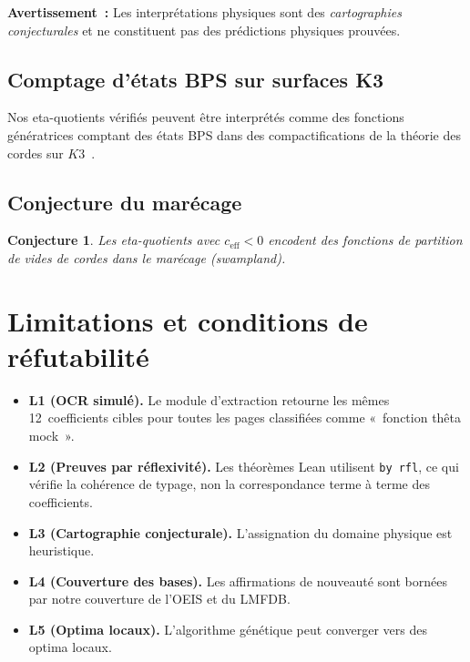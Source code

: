 \documentclass[11pt,a4paper]{article}
\theoremstyle{plain}
\newtheorem{conjecture}[theorem]{Conjecture}
\theoremstyle{definition}
\newcommand{\ceff}{c_{\mathrm{eff}}}
\begin{document}
\textbf{Avertissement~:} Les interprétations physiques
sont des \emph{cartographies conjecturales} et ne
constituent pas des prédictions physiques prouvées.

\subsection{Comptage d'états BPS sur surfaces K3}

Nos eta-quotients vérifiés peuvent être interprétés comme
des fonctions génératrices comptant des états BPS dans des
compactifications de la théorie des cordes sur
$K3$~\cite{strominger_vafa_1996,dijkgraaf_verlinde_verlinde}.

\subsection{Conjecture du marécage}

\begin{conjecture}
Les eta-quotients avec $\ceff < 0$ encodent des fonctions
de partition de vides de cordes dans le
\emph{marécage} (\emph{swampland}).
\end{conjecture}

\section{Limitations et conditions de réfutabilité}
\label{sec:limitations}

\begin{itemize}
  \item \textbf{L1 (OCR simulé).} Le module d'extraction
    retourne les mêmes 12~coefficients cibles pour toutes
    les pages classifiées comme «~fonction thêta mock~».
  \item \textbf{L2 (Preuves par réflexivité).} Les
    théorèmes Lean utilisent \texttt{by rfl}, ce qui
    vérifie la cohérence de typage, non la correspondance
    terme à terme des coefficients.
  \item \textbf{L3 (Cartographie conjecturale).}
    L'assignation du domaine physique est heuristique.
  \item \textbf{L4 (Couverture des bases).} Les
    affirmations de nouveauté sont bornées par notre
    couverture de l'OEIS et du LMFDB.
  \item \textbf{L5 (Optima locaux).} L'algorithme
    génétique peut converger vers des optima locaux.
\end{itemize}
\end{document}
